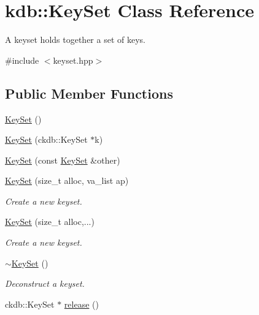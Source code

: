\hypertarget{classkdb_1_1KeySet}{\section{kdb\-:\-:Key\-Set Class Reference}
\label{classkdb_1_1KeySet}
}


A keyset holds together a set of keys.  




{\ttfamily \#include $<$keyset.\-hpp$>$}

\subsection*{Public Member Functions}
\begin{DoxyCompactItemize}
\item 
\hyperlink{classkdb_1_1KeySet_a4eac9850fa4f06c07a5306befc3e4377}{Key\-Set} ()
\begin{DoxyCompactList}\small\item\em \end{DoxyCompactList}\item 
\hyperlink{classkdb_1_1KeySet_a21f651ff310178951402038e590743e0}{Key\-Set} (ckdb\-::\-Key\-Set $\ast$k)
\item 
\hyperlink{classkdb_1_1KeySet_ad8d6df839ab852fded1739ff3398d0b1}{Key\-Set} (const \hyperlink{classkdb_1_1KeySet}{Key\-Set} \&other)
\item 
\hyperlink{classkdb_1_1KeySet_abd9c4225de42a465621e7e9f6bd06d70}{Key\-Set} (size\-\_\-t alloc, va\-\_\-list ap)
\begin{DoxyCompactList}\small\item\em Create a new keyset. \end{DoxyCompactList}\item 
\hyperlink{classkdb_1_1KeySet_ab4bb5ec4e73eca8ea1bd0a843a6489d4}{Key\-Set} (size\-\_\-t alloc,...)
\begin{DoxyCompactList}\small\item\em Create a new keyset. \end{DoxyCompactList}\item 
\hyperlink{classkdb_1_1KeySet_ade654f92bddec24abad1b651e828f2b8}{$\sim$\-Key\-Set} ()
\begin{DoxyCompactList}\small\item\em Deconstruct a keyset. \end{DoxyCompactList}\item 
ckdb\-::\-Key\-Set $\ast$ \hyperlink{classkdb_1_1KeySet_a2987b3fb1b12196399650726f1c18f02}{release} ()

\end{DoxyCompactItemize}
